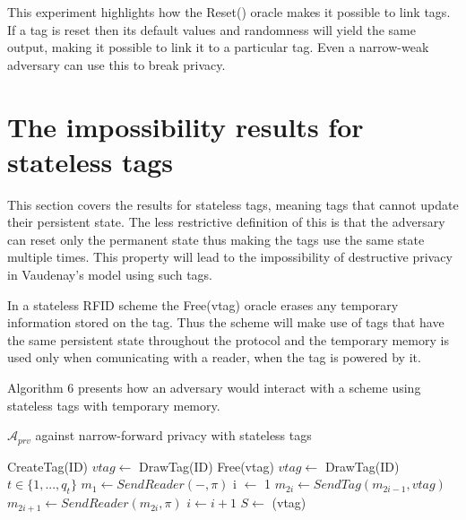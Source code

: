     This experiment highlights how the Reset() oracle makes it possible to link tags. If a tag is reset then its default values and randomness
    will yield the same output, making it possible to link it to a particular tag. Even a narrow-weak adversary can use this to break privacy.

\section{The impossibility results for stateless tags}

    This section covers the results for stateless tags, meaning tags that cannot update their persistent state. The less restrictive definition of this is that
    the adversary can reset only the permanent state thus making the tags use the same state multiple times. This property will lead to the 
    impossibility of destructive privacy in Vaudenay's model using such tags. 

    In a stateless RFID scheme the Free(vtag) oracle erases any temporary information stored on the tag. Thus the scheme will make use of tags that have the same
    persistent state throughout the protocol and the temporary memory is used only when comunicating with a reader, when the tag is powered by it.

    Algorithm 6 presents how an adversary would interact with a scheme using stateless tags with temporary memory.

    \begin{algorithm}[H] %
        \centering
        \caption{$\mathcal{A}_{prv}$ against narrow-forward privacy with stateless tags}
        \begin{algorithmic}[1] %
            \State CreateTag(ID)
            \State $vtag \leftarrow$ DrawTag(ID)
            \State Free(vtag)  
            \State $vtag \leftarrow$ DrawTag(ID)
            \State $t \in \{1, ..., q_t\}$
            \State $m_1 \leftarrow SendReader(-,\pi)$ 
            \State i $\leftarrow$ 1
                \State $m_{2i} \gets SendTag(m_{2i-1}, vtag)$ 
                \State $m_{2i+1} \gets SendReader(m_{2i}, \pi)$
                \State $i \gets i+1$
            \EndWhile
            \State $S \gets$ (vtag)
                \State {}
            \EndIf
        \end{algorithmic}
    \end{algorithm}

